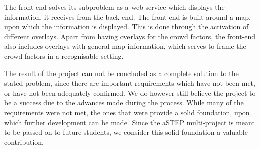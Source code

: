 
The front-end solves its subproblem as a web service which displays the information, it receives from the back-end. The front-end is built around a map, upon which the information is displayed. This is done through the activation of different overlays. Apart from having overlays for the crowd factors, the front-end also includes overlays with general map information, which serves to frame the crowd factors in a recognisable setting.

The result of the project can not be concluded as a complete solution to the stated problem, since there are important requirements which have not been met, or have not been adequately confirmed. We do however still believe the project to be a success due to the advances made during the process. While many of the requirements were not met, the ones that were provide a solid foundation, upon which further development can be made. Since the aSTEP multi-project is meant to be passed on to future students, we consider this solid foundation a valuable contribution.
 
 




